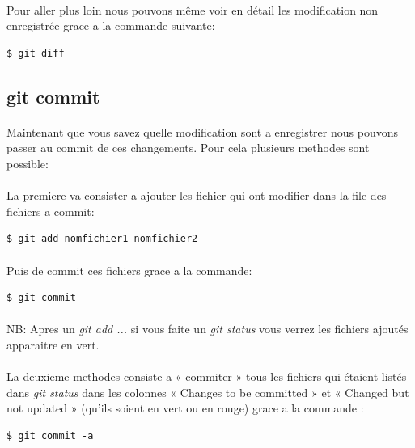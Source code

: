 \documentclass[french, a4paper, 12pt, titlepage]{article}
\begin{document}
\paragraph{}Pour aller plus loin nous pouvons même voir en détail les modification non enregistrée grace a la commande suivante:
\begin{lstlisting}
$ git diff
\end{lstlisting}

\subsection{git commit}
\paragraph{}Maintenant que vous savez quelle modification sont a enregistrer nous pouvons passer au commit de ces changements. Pour cela plusieurs methodes sont possible:

\paragraph{}La premiere va consister a ajouter les fichier qui ont modifier dans la file des fichiers a commit:
\begin{lstlisting}
$ git add nomfichier1 nomfichier2
\end{lstlisting}
\paragraph{}Puis de commit ces fichiers grace a la commande:
\begin{lstlisting}
$ git commit
\end{lstlisting}
\paragraph{}NB: Apres un \emph{git add ...} si vous faite un \emph{git status} vous verrez les fichiers ajoutés apparaitre en vert.

\paragraph{}La deuxieme methodes consiste a « commiter » tous les fichiers qui étaient listés dans \emph{git status} dans les colonnes « Changes to be committed » et « Changed but not updated » (qu’ils soient en vert ou en rouge) grace a la commande :
\begin{lstlisting}
$ git commit -a
\end{lstlisting}
\end{document}

